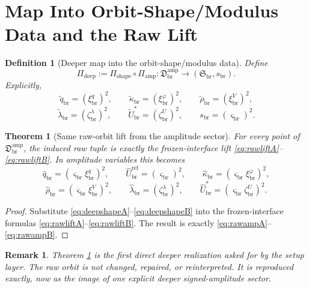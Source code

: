 \documentclass[11pt]{article}
\newcommand{\RespShapeReadout}{\widetilde q_{\mathrm{br}}}
\newcommand{\RespShapeCov}{\widetilde\kappa_{\mathrm{br}}}
\newcommand{\RespShapeRelax}{\widetilde\rho_{\mathrm{br}}}
\newcommand{\RespShapeWell}{\widetilde\lambda_{\mathrm{br}}}
\newcommand{\RespShapeEq}{\widetilde U_{\mathrm{br}}^{\ast}}
\newcommand{\RespRawReadout}{\widehat q_{\mathrm{br}}}
\newcommand{\RespRawRef}{\widehat U_{\mathrm{br}}^{\mathrm{ref}}}
\newcommand{\RespRawCov}{\widehat\kappa_{\mathrm{br}}}
\newcommand{\RespRawRelax}{\widehat\rho_{\mathrm{br}}}
\newcommand{\RespRawWell}{\widehat\lambda_{\mathrm{br}}}
\newcommand{\RespRawEq}{\widehat U_{\mathrm{br}}^{\ast}}
\newcommand{\ShapeTuple}{\mathfrak S_{\mathrm{br}}}
\newcommand{\ScaleMod}{s_{\mathrm{br}}}
\newcommand{\PrimMap}{\Pi_{\mathrm{shape}}}
\newcommand{\DeepSector}{\mathfrak D_{\mathrm{br}}^{\mathrm{amp}}}
\newcommand{\DeepReadAmp}{\xi_{\mathrm{br}}^{q}}
\newcommand{\DeepCovAmp}{\xi_{\mathrm{br}}^{\varphi}}
\newcommand{\DeepRelaxAmp}{\xi_{\mathrm{br}}^{V}}
\newcommand{\DeepWellAmp}{\zeta_{\mathrm{br}}^{\lambda}}
\newcommand{\DeepEqAmp}{\zeta_{\mathrm{br}}^{U}}
\newcommand{\DeepScaleAmp}{\varsigma_{\mathrm{br}}}
\newcommand{\AmpMap}{\Pi_{\mathrm{amp}}}
\newcommand{\DeepMap}{\Pi_{\mathrm{deep}}}
\newtheorem{definition}{Definition}
\newtheorem{remark}{Remark}
\newtheorem{theorem}{Theorem}
\begin{document}
\section{Map Into Orbit-Shape/Modulus Data and the Raw Lift}

\begin{definition}[Deeper map into the orbit-shape/modulus data]
\label{def:deepmap}
Define
\begin{equation}
\DeepMap:=\PrimMap\circ\AmpMap:\DeepSector\longrightarrow(\ShapeTuple,\ScaleMod).
\label{eq:deepmap}
\end{equation}
Explicitly,
\begin{equation}
\RespShapeReadout=(\DeepReadAmp)^{2},
\qquad
\RespShapeCov=(\DeepCovAmp)^{2},
\qquad
\RespShapeRelax=(\DeepRelaxAmp)^{2},
\label{eq:deepshapeA}
\end{equation}
\begin{equation}
\RespShapeWell=(\DeepWellAmp)^{2},
\qquad
\RespShapeEq=(\DeepEqAmp)^{2},
\qquad
\ScaleMod=(\DeepScaleAmp)^{2}.
\label{eq:deepshapeB}
\end{equation}
\end{definition}

\begin{theorem}[Same raw-orbit lift from the amplitude sector]
\label{thm:rawlift}
For every point of \(\DeepSector\), the induced raw tuple is exactly the frozen-interface lift \eqref{eq:rawliftA}--\eqref{eq:rawliftB}. In amplitude variables this becomes
\begin{equation}
\RespRawReadout=(\DeepScaleAmp\DeepReadAmp)^{2},
\qquad
\RespRawRef=(\DeepScaleAmp)^{2},
\qquad
\RespRawCov=(\DeepScaleAmp\DeepCovAmp)^{2},
\label{eq:rawampA}
\end{equation}
\begin{equation}
\RespRawRelax=(\DeepScaleAmp\DeepRelaxAmp)^{2},
\qquad
\RespRawWell=(\DeepWellAmp)^{2},
\qquad
\RespRawEq=(\DeepScaleAmp\DeepEqAmp)^{2}.
\label{eq:rawampB}
\end{equation}
\end{theorem}

\begin{proof}
Substitute \eqref{eq:deepshapeA}--\eqref{eq:deepshapeB} into the frozen-interface formulas \eqref{eq:rawliftA}--\eqref{eq:rawliftB}. The result is exactly \eqref{eq:rawampA}--\eqref{eq:rawampB}.
\end{proof}

\begin{remark}
Theorem \ref{thm:rawlift} is the first direct deeper realization asked for by the setup layer. The raw orbit is not changed, repaired, or reinterpreted. It is reproduced exactly, now as the image of one explicit deeper signed-amplitude sector.
\end{remark}
\end{document}
